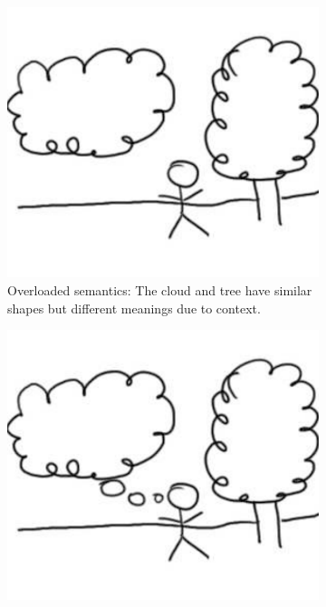 \begin{figure}
  \centering
  \begin{subfigure}[b]{0.3\textwidth}
    \centering
    \includegraphics[width=\textwidth]{img/cloud-1.pdf}  
    \caption{Overloaded semantics: The cloud and tree have similar
             shapes but different meanings due to context.}
    \label{fig:cloud-1} 
  \end{subfigure}
  \hspace{0.03\linewidth}
  \begin{subfigure}[b]{0.3\textwidth}
    \centering
    \includegraphics[width=\textwidth]{img/cloud-2.pdf}  

\end{subfigure}
\end{figure}
